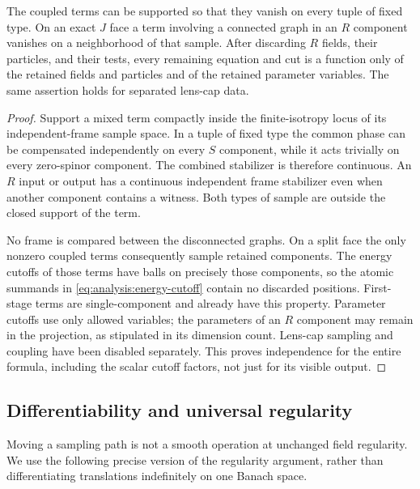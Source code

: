 \begin{lemma}
\label{lem:analysis:R-independence}
The coupled terms can be supported so that they vanish on every tuple
of fixed type.  On an exact $J$ face a term involving a connected graph
in an $R$ component vanishes on a neighborhood of that sample.  After
discarding $R$ fields, their particles, and their tests, every remaining
equation and cut is a function only of the retained fields and particles
and of the retained parameter variables.  The same assertion holds for
separated lens-cap data.
\end{lemma}
\begin{proof}
Support a mixed term compactly inside the finite-isotropy locus of its
independent-frame sample space.  In a tuple of fixed type the common
phase can be compensated independently on every $S$ component, while
it acts trivially on every zero-spinor component.  The combined
stabilizer is therefore continuous.  An $R$ input or output has a
continuous independent frame stabilizer even when another component
contains a witness.  Both types of sample are outside the closed
support of the term.

No frame is compared between the disconnected graphs.  On a split
face the only nonzero coupled terms consequently sample retained
components.  The energy cutoffs of those terms have balls on precisely
those components, so the atomic summands in
\eqref{eq:analysis:energy-cutoff} contain no discarded positions.
First-stage terms are single-component and already have this property.
Parameter cutoffs use only allowed variables; the parameters of an
$R$ component may remain in the projection, as stipulated in its
dimension count.  Lens-cap sampling and coupling have been disabled
separately.  This proves independence for the entire formula, including
the scalar cutoff factors, not just for its visible output.
\end{proof}

\subsection{Differentiability and universal regularity}

Moving a sampling path is not a smooth operation at unchanged field
regularity.  We use the following precise version of the regularity
argument, rather than differentiating translations indefinitely on one
Banach space.

